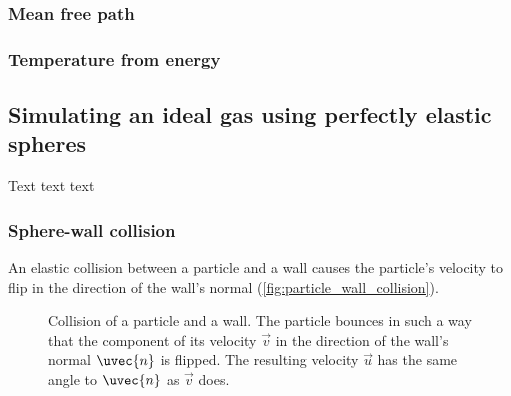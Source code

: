 \subsubsection{Mean free path}
\subsubsection{Temperature from energy}

\subsection{Simulating an ideal gas using perfectly elastic spheres}
Text text text

\subsubsection{Sphere-wall collision}
An elastic collision between a particle and a wall causes the particle's velocity to flip in the direction of the wall's normal (\autoref{fig:particle_wall_collision}).

\begin{figure}
	\begin{center}
	\end{center}
	\caption{Collision of a particle and a wall. The particle bounces in such a way that the component of its velocity $\vec{v}$ in the direction of the wall's normal $\uvec{n}$ is flipped. The resulting velocity $\vec{u}$ has the same angle to $\uvec{n}$ as $\vec{v}$ does.}
	\label{fig:particle_wall_collision}
\end{figure}

